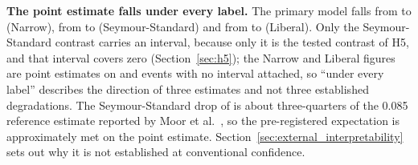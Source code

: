 \begin{table}[H]
    \centering
    \caption{External validation on eICU-CRD (frozen models, no retraining),
    Sepsis-3 anchor on the microbiology-covered sub-cohort. Each variant
    carries its own external label set, so the row counts and event counts
    differ across variants as they do internally.}
    \label{tab:external}
\end{table}

\textbf{The point estimate falls under every label.} The primary
model falls from \pcAurocPrimaryA{} to \pcExtAurocPrimaryA{} (Narrow), from
\pcAurocPrimaryB{} to \pcExtAurocPrimaryB{} (Seymour-Standard) and from
\pcAurocPrimaryC{} to \pcExtAurocPrimaryC{} (Liberal). Only the
Seymour-Standard contrast carries an interval, because only it is the tested
contrast of H5, and that interval covers zero
(Section~\ref{sec:h5}); the Narrow and Liberal figures are point estimates on
\pcExtNEventsA{} and \pcExtNEventsC{} events with no interval attached, so
``under every label'' describes the direction of three estimates and not three
established degradations. The Seymour-Standard
drop of \pcHFiveEst{} is about three-quarters of the 0.085 reference estimate
reported by Moor et al.\ \cite{moor2023review}, so the pre-registered expectation is
approximately met on the point estimate. Section~\ref{sec:external_interpretability}
sets out why it is not established at conventional confidence.

